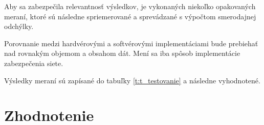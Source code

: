 \documentclass[12pt,a4wide,oneside,openright]{report}
\begin{document}
Aby sa zabezpečila relevantnosť výsledkov, je vykonaných niekoľko opakovaných meraní, ktoré sú následne spriemerované a sprevádzané s výpočtom smerodajnej odchýlky.

Porovnanie medzi hardvérovými a softvérovými implementáciami bude prebiehať nad rovnakým objemom a obsahom dát. Mení sa iba spôsob implementácie zabezpečenia siete.

Výsledky meraní sú zapísané do tabuľky \ref{t:t_testovanie} a následne vyhodnotené.


	\begin{table}[h]
		\centering
		\caption{Tabuľka pre zápis výsledkov z testovania.}
		\label{t:t_testovanie}
	\end{table}
\chapter{Zhodnotenie} \label{s_conclusion}
\end{document}
